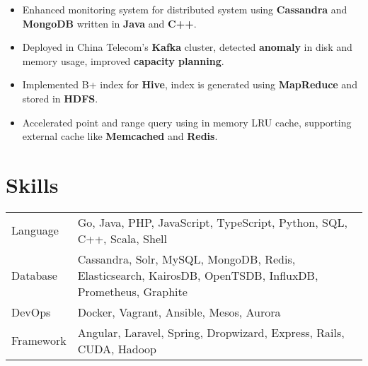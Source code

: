 \documentclass{simple-cv}
\begin{document}

\begin{itemize}
  \item Enhanced monitoring system for distributed system using \textbf{Cassandra} and \textbf{MongoDB} written in \textbf{Java} and \textbf{C++}.
  \item Deployed in China Telecom's \textbf{Kafka} cluster, detected \textbf{anomaly} in disk and memory usage, improved \textbf{capacity planning}.
\end{itemize}


\begin{itemize}
  \item Implemented B+ index for \textbf{Hive}, index is generated using \textbf{MapReduce} and stored in \textbf{HDFS}.
  \item Accelerated point and range query using in memory LRU cache, supporting external cache like \textbf{Memcached} and \textbf{Redis}.
\end{itemize}


\section{Skills}
\begin{tabular}{ l l }
 Language &  Go, Java, PHP, JavaScript, TypeScript, Python, SQL, C++, Scala, Shell\\
 Database & Cassandra, Solr, MySQL, MongoDB, Redis, Elasticsearch, KairosDB, OpenTSDB, InfluxDB, Prometheus, Graphite\\
 DevOps & Docker, Vagrant, Ansible, Mesos, Aurora\\
 Framework & Angular, Laravel, Spring, Dropwizard, Express, Rails, CUDA, Hadoop
\end{tabular}
\end{document}
